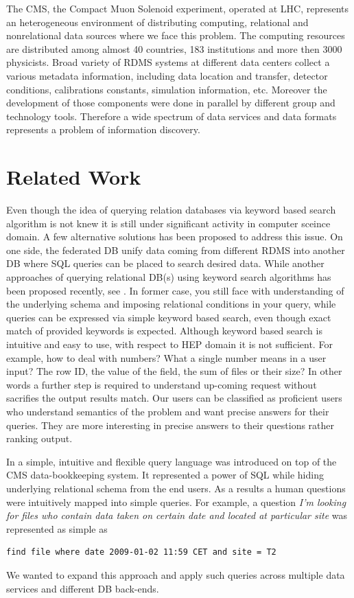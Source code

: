 \documentclass[a4paper]{jpconf}
\begin{document}
The CMS, the Compact Muon Solenoid experiment, operated at LHC,
represents an heterogeneous environment of distributing computing, relational and
nonrelational data sources where we face this problem. The computing resources
are distributed among almost 40 countries, 183 institutions and more then 3000 physicists.
Broad variety of RDMS systems at different data centers collect a various
metadata information, including data location and transfer, detector conditions,
calibrations constants, simulation information, etc. Moreover the development
of those components were done in parallel by different group and technology
tools. Therefore a wide spectrum of data services and
data formats represents a problem of information discovery.

\section{Related Work}
Even though the idea of querying relation databases via keyword based search
algorithm is not knew it is still under significant activity in computer
sceince domain. A few
alternative solutions has been proposed to address this issue. On one
side, the federated DB \cite{FedDB} unify data coming from different
RDMS into another DB where SQL queries can be placed to search desired
data. While another approaches of querying relational
DB(s) using keyword search algorithms has been proposed recently, see
\cite{DBXplorer, QueryAnswer}.
In former case, you still face with understanding of the underlying schema and
imposing relational conditions in your query, while queries can be
expressed via simple keyword based search, even though exact match
of provided keywords is expected. Although keyword based search is
intuitive and easy to use, with respect to HEP domain it is not sufficient. 
For example, how to deal with numbers? What a single number means in a user input?
The row ID, the value of the field, the sum of files or their size? In other
words a further step is required to understand up-coming request without
sacrifies the output results match. Our users can be classified as proficient
users who understand semantics of the problem and want precise answers
for their queries. They are more interesting in precise answers to their
questions rather ranking output.

In \cite{DBS-QL} a simple, intuitive and flexible query language was introduced 
on top of the CMS data-bookkeeping system. It represented a power of SQL while
hiding underlying relational schema from the end users. As a results
a human questions were intuitively mapped into simple queries. For example,
a question
{\it I'm looking for files who contain data taken on certain date and located at
particular site} was represented as simple as
\begin{verbatim}
find file where date 2009-01-02 11:59 CET and site = T2
\end{verbatim}
We wanted to expand this approach and apply such queries across multiple
data services and different DB back-ends. 
\end{document}
